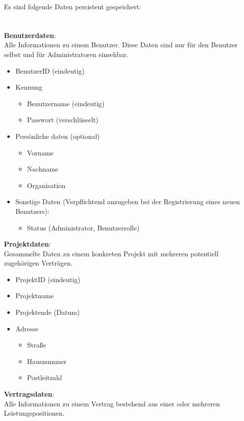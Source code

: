 Es sind folgende Daten persistent gespeichert:\\\\\\
\linebreak
\textbf{Benutzerdaten}: \\ Alle Informationen zu einem Benutzer.  Diese Daten sind nur f\"ur den Benutzer selbst und f\"ur Administratoren einsehbar.\\
\begin{itemize}
\item BenutzerID (eindeutig)
\item Kennung
	\begin{itemize}
	\item Benutzername (eindeutig)
	\item Passwort (verschl\"usselt)
  	\end{itemize}
\item Pers\"onliche daten (optional)
  		\begin{itemize}
	\item Vorname
	\item Nachname
	\item Organisation
\end{itemize}
\item Sonstige Daten (Verpflichtend anzugeben bei der Registrierung eines neuen Benutzers):
\begin{itemize}
	\item Status (Administrator,  Benutzerrolle)\\
	\end{itemize}
\end{itemize}
\textbf{Projektdaten}:\\
Gesammelte Daten zu einem konkreten Projekt mit mehreren potentiell zugeh\"origen Vertr\"agen.
 \begin{itemize}
\item ProjektID (eindeutig)
\item Projektname 
\item Projektende (Datum)
\item Adresse
	\begin{itemize}
	\item Straße
	\item Hausnummer
	\item Postleitzahl
	\end{itemize}
\end{itemize}
\textbf{Vertragsdaten}: \\ Alle Informationen zu einem Vertrag bestehend aus einer oder mehreren Leistungspositionen.
